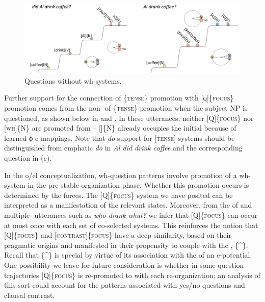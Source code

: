   
\begin{figure}
\includegraphics[width=\textwidth]{figures/Tilsen-img160.png}
\caption{Questions without wh-systems.}
\label{fig:7:16}
\end{figure}
 

  Further support for the connection of \{\textsc{tense}\} promotion with [\textsc{q}]\{\textsc{focus}\} promotion comes from the non- of \{\textsc{tense}\} promotion when the subject NP is questioned, as shown below in  and . In these utterances, neither [Q]\{\textsc{focus}\} nor [\textsc{wh}]\{N\} are promoted from  -- []\{N\} already occupies the initial  because of learned ϕ-e mappings. Note that \textit{do}{}-support for [\textsc{tense}] systems should be distinguished from emphatic \textit{do} in \textit{Al did drink coffee} and the corresponding question in (c).  

\ea\label{ex:7:18}
   \label{ex:7:18a}
  \label{ex:7:18b}
  \label{ex:7:18c}
  \z
\z

  In the o/el conceptualization, wh-question patterns involve promotion of a wh-system in the pre-stable organization phase. Whether this promotion occurs is determined by the  forces. The [\textsc{Q}]\{\textsc{focus}\} system we have posited can be interpreted as a manifestation of the relevant  states. Moreover, from the  of  and multiple- utterances such as \textit{who drank what?} we infer that [Q]\{\textsc{focus}\} can occur at most once with each set of co-selected systems. This reinforces the notion that [Q]\{\textsc{focus}\} and [\textsc{contrast}]\{\textsc{focus}\} have a deep similarity, based on their pragmatic origins and manifested in their propensity to couple with the , \{\^{}\}. Recall that \{\^{}\} is special by virtue of its association with the  of an e-potential. One possibility we leave for future consideration is whether in some question trajectories [Q]\{\textsc{focus}\} is re-promoted to  with each re-or\-ga\-ni\-za\-tion; an analysis of this sort could account for the  patterns associated with yes/no questions and clausal contrast.

